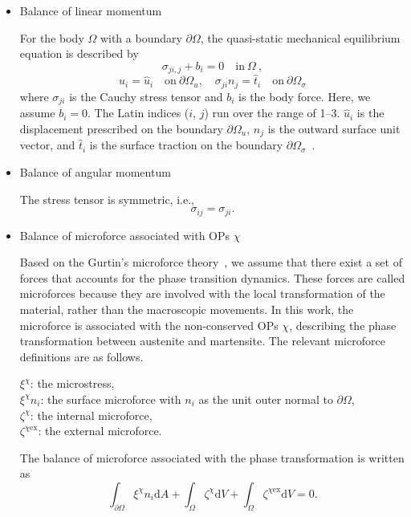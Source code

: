 \documentclass[reprint,3p,sort&compress,times,onecolumn]{elsarticle}
\begin{document}
\begin{itemize}
\item Balance of linear momentum

For the body $\Omega$ with a boundary $\partial\Omega$, the quasi-static mechanical equilibrium equation is described by
\begin{equation}
\sigma_{ji,j} + b_i= 0 \quad \text{in}~\Omega ~, \label{eq-mecheq}
\end{equation}
\begin{equation}
u_i=\hat{u}_i \quad \text{on}~\partial\Omega_u, \quad \sigma_{ji}n_{j}=\hat{t}_i \quad \text{on}~\partial\Omega_{\sigma}
\end{equation}
where $\sigma_{ji}$ is the Cauchy stress tensor and $b_i$ is the body force. Here, we assume $b_i=0$. The Latin indices ($i$, $j$) run over the range of 1--3. $\hat{u}_i$ is the displacement prescribed on the boundary $\partial\Omega_u$, $n_j$ is the outward surface unit vector, and $\hat{t}_i$ is the surface traction on the boundary $\partial\Omega_{\sigma}$~\cite{yi2016real}.


\item Balance of angular momentum

The stress tensor is symmetric, i.e.,
\begin{equation}
\sigma_{ij}=\sigma_{ji} . \label{eq-angular-m}
\end{equation}

\item Balance of microforce associated with OPs $\chi$

Based on the Gurtin's microforce theory~\cite{gurtin1996generalized}, we assume that there exist a set of forces that accounts for the phase transition dynamics. These forces are called microforces because they are involved with the local transformation of the material, rather than the macroscopic movements. In this work, the microforce is associated with the non-conserved OPs $\chi$, describing the phase transformation between austenite and martensite.
The relevant microforce definitions are as follows.

$\xi^{\chi}$: the microstress, \\
$\xi^{\chi} n_i$: the surface microforce with $n_i$ as the unit outer normal to $\partial\Omega$, \\
$\zeta^{\chi}$: the internal microforce, \\
$\zeta^{\chi \text{ex}}$: the external microforce.

The balance of microforce associated with the phase transformation is written as
\begin{equation}
\int_{\partial\Omega} \xi^{\chi} n_i \text{d}A + \int_{\Omega}\zeta^{\chi} \text{d}V + \int_\Omega \zeta^{\chi \text{ex}} \text{d}V=0.
\end{equation}


\end{itemize}
\end{document}
